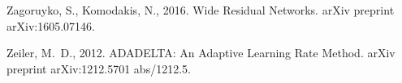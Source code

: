 \documentclass[letterpaper,final,authoryear,3p,times,twocolumn]{elsarticle}
\begin{document}
\begin{thebibliography}{36}
Zagoruyko, S., Komodakis, N., 2016. {Wide Residual Networks}. arXiv preprint
  arXiv:1605.07146.

Zeiler, M.~D., 2012. {ADADELTA: An Adaptive Learning Rate Method}. arXiv
  preprint arXiv:1212.5701 abs/1212.5.

\end{thebibliography}
\end{document}
